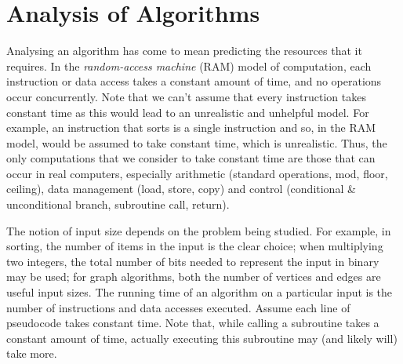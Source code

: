 \documentclass[12pt]{article}
\begin{document}
\section{Analysis of Algorithms}
Analysing an algorithm has come to mean predicting the resources that it requires. In the \textit{random-access
machine} (RAM) model of computation, each instruction or data access takes a constant amount of time, and
no operations occur concurrently. Note that we can't assume that every instruction takes constant time as this
would lead to an unrealistic and unhelpful model. For example, an instruction that sorts is a single instruction and
so, in the RAM model, would be assumed to take constant time, which is unrealistic. Thus, the only computations that we consider
to take constant time are those that can occur in real computers, especially arithmetic (standard operations, mod, floor, ceiling), data
management (load, store, copy) and control (conditional \& unconditional branch, subroutine call, return).

The notion of input size depends on the problem being studied. For example, in sorting, the number of items in the input
is the clear choice; when multiplying two integers, the total number of bits needed to represent the input in binary
may be used; for graph algorithms, both the number of vertices and edges are useful input sizes. The running time of an
algorithm on a particular input is the number of instructions and data accesses executed. Assume each line of pseudocode takes
constant time. Note that, while calling a subroutine takes a constant amount of time, actually executing this subroutine may (and
likely will) take more.
\end{document}
